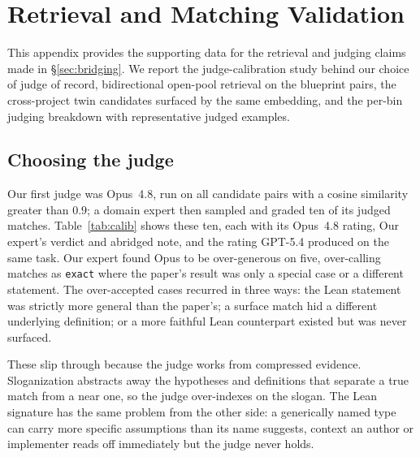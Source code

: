 \section{Retrieval and Matching Validation}
\label{sec:exp2}

This appendix provides the supporting data for the retrieval and judging claims made in \S\ref{sec:bridging}. We report the judge-calibration study behind our choice of judge of record, bidirectional open-pool retrieval on the blueprint pairs, the cross-project twin candidates surfaced by the same embedding, and the per-bin judging breakdown with representative judged examples.

\subsection{Choosing the judge}\label{app:calib}
Our first judge was Opus~4.8, run on all candidate pairs with a cosine similarity greater than $0.9$; a domain expert then sampled and graded ten of its judged matches. Table~\ref{tab:calib} shows these ten, each with its Opus~4.8 rating, Our expert's verdict and abridged note, and the rating GPT-5.4 produced on the same task. Our expert found Opus to be over-generous on five, over-calling matches as \texttt{exact} where the paper's result was only a special case or a different statement. The over-accepted cases recurred in three ways: the Lean statement was strictly more general than the paper's; a surface match hid a different underlying definition; or a more faithful Lean counterpart existed but was never surfaced.

These slip through because the judge works from compressed evidence. Sloganization abstracts away the hypotheses and definitions that separate a true match from a near one, so the judge over-indexes on the slogan. The Lean signature has the same problem from the other side: a generically named type can carry more specific assumptions than its name suggests, context an author or implementer reads off immediately but the judge never holds.

